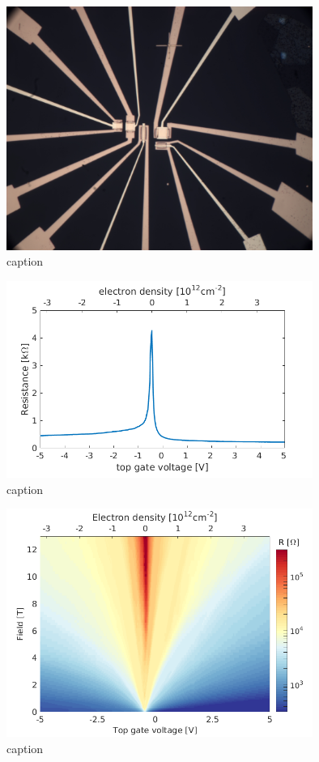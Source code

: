 \begin{figure}
\centering
\includegraphics[width=100mm]{figures/magneto/100x.jpg}
\caption{caption}
\label{fig:m_Giorgio}
\end{figure}

\begin{figure}
\centering
\includegraphics[width=100mm]{figures/magneto/R.png}
\caption{caption}
\label{fig:m_R}
\end{figure}

\begin{figure}
\centering
\includegraphics[width=100mm]{figures/magneto/Fan_R.png}
\caption{caption}
\label{fig:m_Fan_R}
\end{figure}

